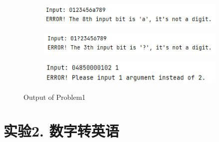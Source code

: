 \begin{figure}[H]
\begin{subfigure}{0.325\linewidth}
	\end{subfigure}
    \vspace{1cm}
    \begin{subfigure}{0.325\linewidth}
		\centering
		\includegraphics[width=1\linewidth]{../pic/1/1.7.png}
	\end{subfigure}
	\begin{subfigure}{0.325\linewidth}
		\centering
		\includegraphics[width=1\linewidth]{../pic/1/1.8.png}
	\end{subfigure}
	\begin{subfigure}{0.325\linewidth}
		\centering
		\includegraphics[width=1\linewidth]{../pic/1/1.9.png}
	\end{subfigure}
	\caption{Output of Problem1}
\end{figure}

\newpage
\section{实验2. 数字转英语}

    

